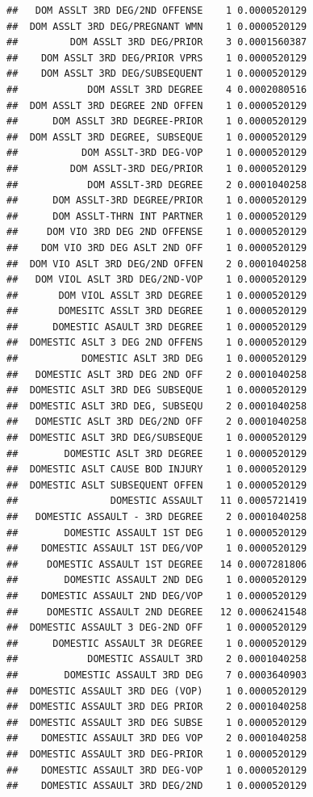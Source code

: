\documentclass[]{book}
\begin{document}
\begin{verbatim}
##   DOM ASSLT 3RD DEG/2ND OFFENSE    1 0.0000520129
##  DOM ASSLT 3RD DEG/PREGNANT WMN    1 0.0000520129
##         DOM ASSLT 3RD DEG/PRIOR    3 0.0001560387
##    DOM ASSLT 3RD DEG/PRIOR VPRS    1 0.0000520129
##    DOM ASSLT 3RD DEG/SUBSEQUENT    1 0.0000520129
##            DOM ASSLT 3RD DEGREE    4 0.0002080516
##  DOM ASSLT 3RD DEGREE 2ND OFFEN    1 0.0000520129
##      DOM ASSLT 3RD DEGREE-PRIOR    1 0.0000520129
##  DOM ASSLT 3RD DEGREE, SUBSEQUE    1 0.0000520129
##           DOM ASSLT-3RD DEG-VOP    1 0.0000520129
##         DOM ASSLT-3RD DEG/PRIOR    1 0.0000520129
##            DOM ASSLT-3RD DEGREE    2 0.0001040258
##      DOM ASSLT-3RD DEGREE/PRIOR    1 0.0000520129
##      DOM ASSLT-THRN INT PARTNER    1 0.0000520129
##     DOM VIO 3RD DEG 2ND OFFENSE    1 0.0000520129
##    DOM VIO 3RD DEG ASLT 2ND OFF    1 0.0000520129
##  DOM VIO ASLT 3RD DEG/2ND OFFEN    2 0.0001040258
##   DOM VIOL ASLT 3RD DEG/2ND-VOP    1 0.0000520129
##       DOM VIOL ASSLT 3RD DEGREE    1 0.0000520129
##       DOMESITC ASSLT 3RD DEGREE    1 0.0000520129
##      DOMESTIC ASAULT 3RD DEGREE    1 0.0000520129
##  DOMESTIC ASLT 3 DEG 2ND OFFENS    1 0.0000520129
##           DOMESTIC ASLT 3RD DEG    1 0.0000520129
##   DOMESTIC ASLT 3RD DEG 2ND OFF    2 0.0001040258
##  DOMESTIC ASLT 3RD DEG SUBSEQUE    1 0.0000520129
##  DOMESTIC ASLT 3RD DEG, SUBSEQU    2 0.0001040258
##   DOMESTIC ASLT 3RD DEG/2ND OFF    2 0.0001040258
##  DOMESTIC ASLT 3RD DEG/SUBSEQUE    1 0.0000520129
##        DOMESTIC ASLT 3RD DEGREE    1 0.0000520129
##  DOMESTIC ASLT CAUSE BOD INJURY    1 0.0000520129
##  DOMESTIC ASLT SUBSEQUENT OFFEN    1 0.0000520129
##                DOMESTIC ASSAULT   11 0.0005721419
##   DOMESTIC ASSAULT - 3RD DEGREE    2 0.0001040258
##        DOMESTIC ASSAULT 1ST DEG    1 0.0000520129
##    DOMESTIC ASSAULT 1ST DEG/VOP    1 0.0000520129
##     DOMESTIC ASSAULT 1ST DEGREE   14 0.0007281806
##        DOMESTIC ASSAULT 2ND DEG    1 0.0000520129
##    DOMESTIC ASSAULT 2ND DEG/VOP    1 0.0000520129
##     DOMESTIC ASSAULT 2ND DEGREE   12 0.0006241548
##  DOMESTIC ASSAULT 3 DEG-2ND OFF    1 0.0000520129
##      DOMESTIC ASSAULT 3R DEGREE    1 0.0000520129
##            DOMESTIC ASSAULT 3RD    2 0.0001040258
##        DOMESTIC ASSAULT 3RD DEG    7 0.0003640903
##  DOMESTIC ASSAULT 3RD DEG (VOP)    1 0.0000520129
##  DOMESTIC ASSAULT 3RD DEG PRIOR    2 0.0001040258
##  DOMESTIC ASSAULT 3RD DEG SUBSE    1 0.0000520129
##    DOMESTIC ASSAULT 3RD DEG VOP    2 0.0001040258
##  DOMESTIC ASSAULT 3RD DEG-PRIOR    1 0.0000520129
##    DOMESTIC ASSAULT 3RD DEG-VOP    1 0.0000520129
##    DOMESTIC ASSAULT 3RD DEG/2ND    1 0.0000520129

\end{verbatim}
\end{document}
